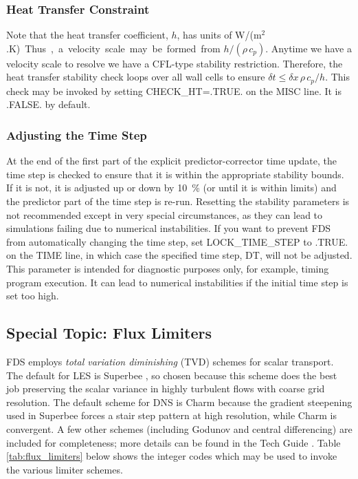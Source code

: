 \documentclass[11pt]{book}
\begin{document}
\subsubsection{Heat Transfer Constraint}

Note that the heat transfer coefficient, $h$, has units of \si{W/(m$^2$.K)}.  Thus, a velocity scale may be formed from $h/(\rho\, c_p)$.
Anytime we have a velocity scale to resolve we have a CFL-type stability restriction.
Therefore, the heat transfer stability check loops over all wall cells to ensure $\delta t \le \delta x \,\rho \,c_p/h$.
This check may be invoked by setting {\ct CHECK\_HT=.TRUE.} on the {\ct MISC} line. It is {\ct .FALSE.} by default.


\subsubsection{Adjusting the Time Step}

At the end of the first part of the explicit predictor-corrector time update, the time step is checked to ensure that it is within the appropriate stability bounds. If it is not, it is adjusted up or down by 10~\% (or until it is within limits) and the predictor part of the time step is re-run. Resetting the stability parameters is not recommended except in very special circumstances, as they can lead to simulations failing due to numerical instabilities. If you want to prevent FDS from automatically changing the time step, set {\ct LOCK\_TIME\_STEP} to {\ct .TRUE.} on the {\ct TIME} line, in which case the specified time step, {\ct DT}, will not be adjusted. This parameter is intended for diagnostic purposes only, for example, timing program execution. It can lead to numerical instabilities if the initial time step is set too high.


\subsection{Special Topic: Flux Limiters}
\label{info:flux_limiters}

FDS employs \emph{total variation diminishing} (TVD) schemes for scalar transport.  The default for LES is Superbee \cite{Roe:1986}, so chosen because this scheme does the best job preserving the scalar variance in highly turbulent flows with coarse grid resolution.  The default scheme for DNS is Charm \cite{Zhou:1995} because the gradient steepening used in Superbee forces a stair step pattern at high resolution, while Charm is convergent.   A few other schemes (including Godunov and central differencing) are included for completeness; more details can be found in the Tech Guide \cite{FDS_Tech_Guide}.  Table \ref{tab:flux_limiters} below shows the integer codes which may be used to invoke the various limiter schemes.
\end{document}
